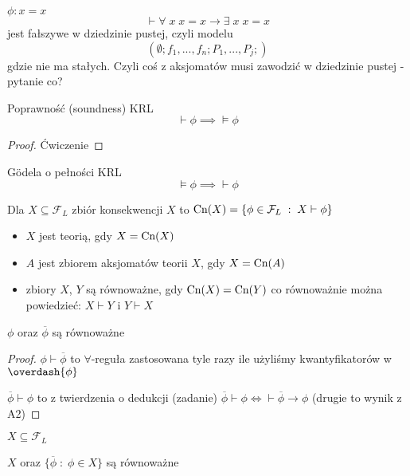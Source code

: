 \begin{example}
  $\phi:x=x$
  $$\vdash\forall\;x\;x=x\to\exists\;x\;x=x$$
  jest fałszywe w dziedzinie pustej, czyli modelu
  $$(\emptyset; f_1,...,f_n; P_1,...,P_j;)$$
  gdzie nie ma stałych. Czyli coś z aksjomatów musi zawodzić w dziedzinie pustej - pytanie co?
\end{example}

\begin{center}
\end{center}

\begin{remark}{}{}
  Poprawność (soundness) KRL
  $$\vdash\phi\implies \models\phi$$
\end{remark}
\begin{proof}
  Ćwiczenie
\end{proof}

\begin{theorem}{G\"odela o pełności KRL}{}
  $$\models\phi\implies\vdash\phi$$
\end{theorem}

\begin{definition}{}{}
  Dla $X\subseteq\mathcal{F}_L$ zbiór konsekwencji $X$ to $\text{Cn}(X)=\{\phi\in\mathcal{F}_L\;:\;X\vdash \phi\}$
  \begin{itemize}
    \item $X$ jest teorią, gdy $X=\text{Cn}(X)$
    \item $A$ jest zbiorem aksjomatów teorii $X$, gdy $X=\text{Cn}(A)$
    \item zbiory $X$, $Y$ są równoważne, gdy $\text{Cn}(X)=\text{Cn}(Y)$ co równoważnie można powiedzieć: $X\vdash Y$ i $Y\vdash X$
  \end{itemize}
\end{definition}

\begin{fact}{}{}
  $\phi$ oraz $\overline{\phi}$ są równoważne
\end{fact}
\begin{proof}
  $\phi\vdash\overline{\phi}$ to $\forall$-reguła zastosowana tyle razy ile użyliśmy kwantyfikatorów w $\overdash{\phi}$

  $\overline{\phi}\vdash\phi$ to z twierdzenia o dedukcji (zadanie) $\overline{\phi}\vdash\phi\iff\vdash\overline{\phi}\to\phi$ (drugie to wynik z A2) 
\end{proof}

\begin{conclusion}
  $X\subseteq\mathcal{F}_L$

  $X$ oraz $\{\overline{\phi}\;:\;\phi\in X\}$ są równoważne
\end{conclusion}


